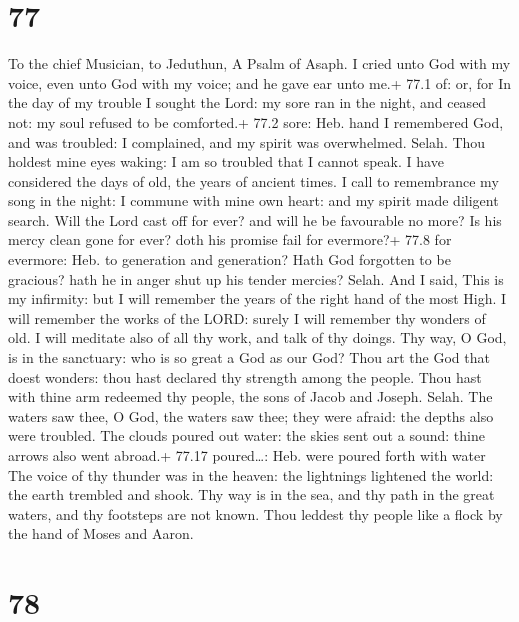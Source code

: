 \hypertarget{section-76}{%
\section{77}\label{section-76}}

To the chief Musician, to Jeduthun, A Psalm of Asaph.  I
cried unto God with my voice, even unto God with my voice; and he gave
ear unto me.+ 77.1 of: or, for  In the day of my trouble I
sought the Lord: my sore ran in the night, and ceased not: my soul
refused to be comforted.+ 77.2 sore: Heb. hand  I remembered
God, and was troubled: I complained, and my spirit was overwhelmed.
Selah.  Thou holdest mine eyes waking: I am so troubled that
I cannot speak.  I have considered the days of old, the
years of ancient times.  I call to remembrance my song in
the night: I commune with mine own heart: and my spirit made diligent
search.  Will the Lord cast off for ever? and will he be
favourable no more?  Is his mercy clean gone for ever? doth
his promise fail for evermore?+ 77.8 for evermore: Heb. to generation
and generation?  Hath God forgotten to be gracious? hath he
in anger shut up his tender mercies? Selah.  And I said,
This is my infirmity: but I will remember the years of the right hand of
the most High.  I will remember the works of the LORD:
surely I will remember thy wonders of old.  I will meditate
also of all thy work, and talk of thy doings.  Thy way, O
God, is in the sanctuary: who is so great a God as our God?
 Thou art the God that doest wonders: thou hast declared
thy strength among the people.  Thou hast with thine arm
redeemed thy people, the sons of Jacob and Joseph. Selah. 
The waters saw thee, O God, the waters saw thee; they were afraid: the
depths also were troubled.  The clouds poured out water:
the skies sent out a sound: thine arrows also went abroad.+ 77.17
poured\ldots: Heb. were poured forth with water  The voice
of thy thunder was in the heaven: the lightnings lightened the world:
the earth trembled and shook.  Thy way is in the sea, and
thy path in the great waters, and thy footsteps are not known.
 Thou leddest thy people like a flock by the hand of Moses
and Aaron.

\hypertarget{section-77}{%
\section{78}\label{section-77}}

